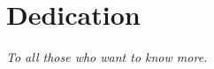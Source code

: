\chapter*{Dedication}
\thispagestyle{empty}

\begin{center}
\vspace*{5cm}
\emph{To all those who want to know more.}
\end{center}